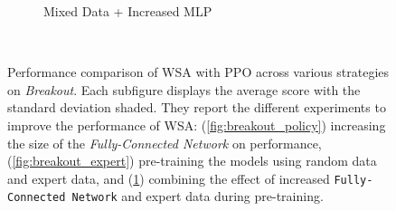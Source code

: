 \begin{figure}[ht]
\begin{subfigure}[b]{0.32\textwidth}
        \caption{Mixed Data + Increased MLP}
        \label{fig:breakout_expert_policy}
    \end{subfigure}~\caption{Performance comparison of WSA with PPO across various strategies on \textit{Breakout}. Each subfigure displays the average score with the standard deviation shaded. They report the different experiments to improve the performance of WSA: (\ref{fig:breakout_policy}) increasing the size of the \textit{Fully-Connected Network} on performance, (\ref{fig:breakout_expert}) pre-training the models using random data and expert data, and (\ref{fig:breakout_expert_policy}) combining the effect of increased \texttt{Fully-Connected Network} and expert data during pre-training.}
    \label{fig:breakout_study}
\end{figure}




